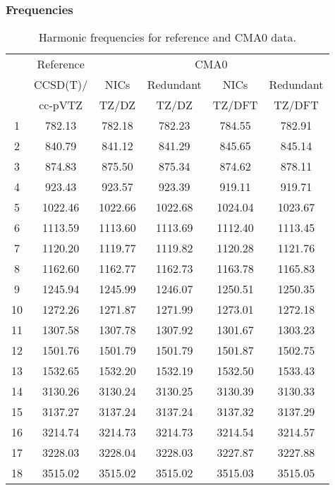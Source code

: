 \documentclass[10pt,oneside]{article}
\begin{document}
\begin{table}[h!]
\subsubsection*{Frequencies}
\centering
\caption{Harmonic frequencies for reference and CMA0 data.}
\begin{tabular}{cccccc}
\toprule
{} & Reference & \multicolumn{4}{c}{CMA0} \\
{} &  CCSD(T)/ &    NICs &  Redundant &    NICs & Redundant \\
{} &   cc-pVTZ &   TZ/DZ &      TZ/DZ &  TZ/DFT &    TZ/DFT \\
\midrule
1  &    782.13 &  782.18 &     782.23 &  784.55 &    782.91 \\
2  &    840.79 &  841.12 &     841.29 &  845.65 &    845.14 \\
3  &    874.83 &  875.50 &     875.34 &  874.62 &    878.11 \\
4  &    923.43 &  923.57 &     923.39 &  919.11 &    919.71 \\
5  &   1022.46 & 1022.66 &    1022.68 & 1024.04 &   1023.67 \\
6  &   1113.59 & 1113.60 &    1113.69 & 1112.40 &   1113.45 \\
7  &   1120.20 & 1119.77 &    1119.82 & 1120.28 &   1121.76 \\
8  &   1162.60 & 1162.77 &    1162.73 & 1163.78 &   1165.83 \\
9  &   1245.94 & 1245.99 &    1246.07 & 1250.51 &   1250.35 \\
10 &   1272.26 & 1271.87 &    1271.99 & 1273.01 &   1272.18 \\
11 &   1307.58 & 1307.78 &    1307.92 & 1301.67 &   1303.23 \\
12 &   1501.76 & 1501.79 &    1501.79 & 1501.87 &   1502.75 \\
13 &   1532.65 & 1532.20 &    1532.19 & 1532.50 &   1533.43 \\
14 &   3130.26 & 3130.24 &    3130.25 & 3130.39 &   3130.33 \\
15 &   3137.27 & 3137.24 &    3137.24 & 3137.32 &   3137.29 \\
16 &   3214.74 & 3214.73 &    3214.73 & 3214.54 &   3214.57 \\
17 &   3228.03 & 3228.04 &    3228.03 & 3227.87 &   3227.88 \\
18 &   3515.02 & 3515.02 &    3515.02 & 3515.03 &   3515.05 \\
\bottomrule
\end{tabular}
\end{table}
\end{document}
